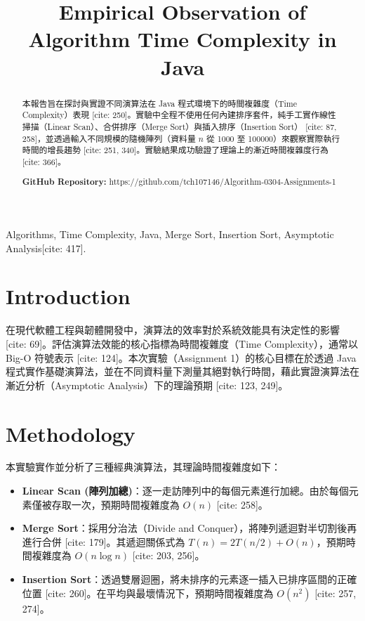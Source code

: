 \documentclass[conference, a4paper]{IEEEtran}
\title{Empirical Observation of Algorithm Time Complexity in Java}
\author{\IEEEauthorblockN{蔡晟旭 (Student ID: 1113405013)}
\IEEEauthorblockA{國立澎湖科技大學 資訊工程學系 \\
National Penghu University of Science and Technology}}
\begin{document}
\maketitle

\begin{abstract}
本報告旨在探討與實證不同演算法在 Java 程式環境下的時間複雜度（Time Complexity）表現 [cite: 250]。實驗中全程不使用任何內建排序套件，純手工實作線性掃描（Linear Scan）、合併排序（Merge Sort）與插入排序（Insertion Sort） [cite: 87, 258]，並透過輸入不同規模的隨機陣列（資料量 $n$ 從 1000 至 100000）來觀察實際執行時間的增長趨勢 [cite: 251, 340]。實驗結果成功驗證了理論上的漸近時間複雜度行為 [cite: 366]。

\vspace{0.2cm}
\textbf{GitHub Repository:} https://github.com/tch107146/Algorithm-0304-Assignments-1
\end{abstract}

\begin{IEEEkeywords}
Algorithms, Time Complexity, Java, Merge Sort, Insertion Sort, Asymptotic Analysis[cite: 417].
\end{IEEEkeywords}

\section{Introduction}
在現代軟體工程與韌體開發中，演算法的效率對於系統效能具有決定性的影響 [cite: 69]。評估演算法效能的核心指標為時間複雜度（Time Complexity），通常以 Big-O 符號表示 [cite: 124]。本次實驗（Assignment 1）的核心目標在於透過 Java 程式實作基礎演算法，並在不同資料量下測量其絕對執行時間，藉此實證演算法在漸近分析（Asymptotic Analysis）下的理論預期 [cite: 123, 249]。

\section{Methodology}
本實驗實作並分析了三種經典演算法，其理論時間複雜度如下：
\begin{itemize}
    \item \textbf{Linear Scan (陣列加總)}：逐一走訪陣列中的每個元素進行加總。由於每個元素僅被存取一次，預期時間複雜度為 $O(n)$ [cite: 258]。
    \item \textbf{Merge Sort}：採用分治法（Divide and Conquer），將陣列遞迴對半切割後再進行合併 [cite: 179]。其遞迴關係式為 $T(n) = 2T(n/2) + O(n)$，預期時間複雜度為 $O(n \log n)$ [cite: 203, 256]。
    \item \textbf{Insertion Sort}：透過雙層迴圈，將未排序的元素逐一插入已排序區間的正確位置 [cite: 260]。在平均與最壞情況下，預期時間複雜度為 $O(n^2)$ [cite: 257, 274]。
\end{itemize}
\end{document}

